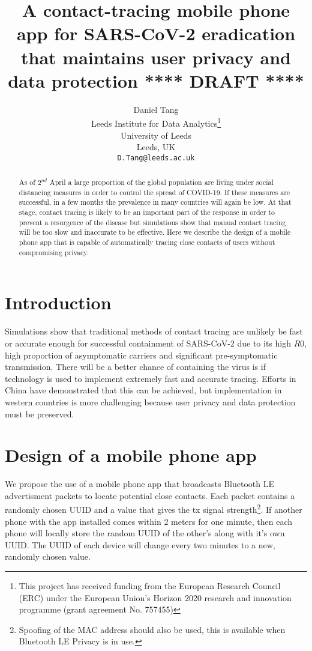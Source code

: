 \documentclass{article}
\title{A contact-tracing mobile phone app for SARS-CoV-2 eradication that maintains user privacy and data protection
\textbf{**** DRAFT ****}
}
\author{
  Daniel Tang\\
  Leeds Institute for Data Analytics\thanks{This project has received funding from the European Research Council (ERC) under the European Union’s Horizon 2020 research and innovation programme (grant agreement No. 757455)}\\
  University of Leeds\\
  Leeds, UK\\
  \texttt{D.Tang@leeds.ac.uk} \\
}
\begin{document}
\maketitle

\begin{abstract}
As of $2^{nd}$ April a large proportion of the global population are living under social distancing measures in order to control the spread of COVID-19. If these measures are successful, in a few months the prevalence in many countries will again be low. At that stage, contact tracing is likely to be an important part of the response in order to prevent a resurgence of the disease but simulations show\cite{tang2020Contact} that manual contact tracing will be too slow and inaccurate to be effective. Here we describe the design of a mobile phone app that is capable of automatically tracing close contacts of users without compromising privacy.
\end{abstract}


\section{Introduction}

Simulations show\cite{tang2020Contact} that traditional methods of contact tracing are unlikely be fast or accurate enough for successful containment of SARS-CoV-2 due to its high $R0$, high proportion of asymptomatic carriers and significant pre-symptomatic transmission. There will be a better chance of containing the virus is if technology is used to implement extremely fast and accurate tracing. Efforts in China have demonstrated that this can be achieved, but implementation in western countries is more challenging because user privacy and data protection must be preserved.

\section{Design of a mobile phone app}

We propose the use of a mobile phone app that broadcasts Bluetooth LE advertisment packets to locate potential close contacts. Each packet contains a randomly chosen UUID and a value that gives the tx signal strength\footnote{Spoofing of the MAC address should also be used, this is available when Bluetooth LE Privacy is in use.}. If another phone with the app installed comes within 2 meters for one minute, then each phone will locally store the random UUID of the other's along with it's own UUID. The UUID of each device will change every two minutes to a new, randomly chosen value.
\end{document}
